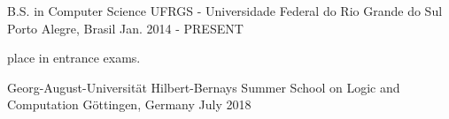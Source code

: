 \begin{cventries}
  \cventry
    {B.S. in Computer Science}
    {UFRGS - Universidade Federal do Rio Grande do Sul}
    {Porto Alegre, Brasil}
    {Jan. 2014 - PRESENT}
    {
      \begin{cvitems}
        \item { place in entrance exams.}
      \end{cvitems}
    }
\end{cventries}


\begin{cventries}
  \cvcompactentry
    {Georg-August-Universität}
    {Hilbert-Bernays Summer School on Logic and Computation}
    {Göttingen, Germany}
    {July 2018}
\end{cventries}
